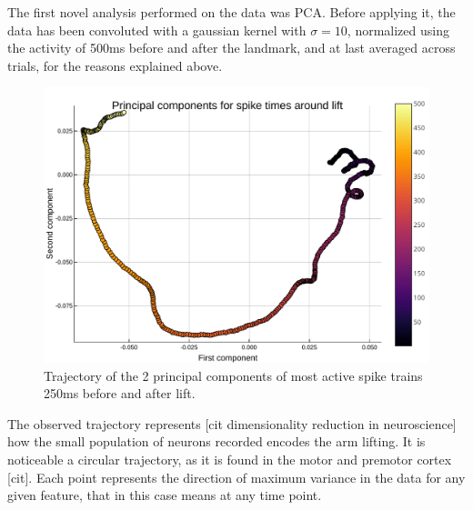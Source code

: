 
The first novel analysis performed on the data was PCA.	Before applying it, the data has been convoluted with a gaussian kernel with $\sigma=10$, normalized using the activity of 500ms before and after the landmark, and at last averaged across trials, for the reasons explained above.
\begin{figure}[h!]
	\centering
	\includegraphics[scale=0.8]{../../plots/pca-500-lift.pdf}
	\caption{Trajectory of the 2 principal components of most active spike trains 250ms before and after lift. 
}
	\label{fig:pca-500}
\end{figure}

The observed trajectory represents [cit dimensionality reduction in neuroscience] how the small population of neurons recorded encodes the arm lifting. It is noticeable a circular trajectory, as it is found in the motor and premotor cortex [cit]. 
Each point represents the direction of maximum variance in the data for any given feature, that in this case means at any time point. 

